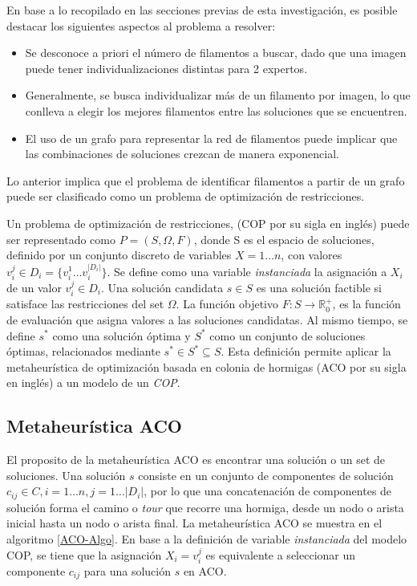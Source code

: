 En base a lo recopilado en las secciones previas de esta investigaci\'on, es posible destacar los siguientes aspectos al problema a resolver:

\begin{itemize}
    \item Se desconoce a priori el n\'umero de filamentos a buscar, dado que una imagen puede tener individualizaciones distintas para 2 expertos.
    \item Generalmente, se busca individualizar m\'as de un filamento por imagen, lo que conlleva a elegir los mejores filamentos entre las soluciones que se encuentren.
    \item El uso de un grafo para representar la red de filamentos puede implicar que las combinaciones de soluciones crezcan de manera exponencial.
\end{itemize}

Lo anterior implica que el problema de identificar filamentos a partir de un grafo puede ser clasificado como un problema de optimizaci\'on de restricciones\cite{blum2011hybrid}.

Un problema de optimización de restricciones, (COP por su sigla en ingl\'es) puede ser representado como $P = (S, \Omega, F)$, donde S es el espacio de soluciones, definido por un conjunto discreto de variables $X = 1 \dotsc n$, con valores $v_{i}^{j} \in D_{i} = \{v_{i}^{1} \dotsc  v_{i}^{|D_{i}|}\}$. Se define como una variable {\it instanciada} la asignaci\'on a $X_i$ de un valor $v_{i}^{j} \in D_i$. Una solución candidata $s \in S$ es una soluci\'on factible si satisface las restricciones del set $\Omega$. La funci\'on objetivo $F: S\rightarrow \mathbb R_{0}^{+}$, es la funci\'on de evaluaci\'on que asigna valores a las soluciones candidatas. Al mismo tiempo, se define $s^{*}$ como una soluci\'on \'optima y $S^{*}$ como un conjunto de soluciones \'optimas, relacionados mediante $s^{*} \in S^{*} \subseteq S $\cite{socha2008ant}.
Esta definici\'on permite aplicar la metaheur\'istica de optimizaci\'on basada en colonia de hormigas (ACO por su sigla en ingl\'es) a un modelo de un {\it COP}.

\subsection{Metaheur\'istica ACO}
El proposito de la metaheur\'istica ACO es encontrar una soluci\'on o un set de soluciones. Una soluci\'on $s$ consiste en un conjunto de componentes de soluci\'on $c_{ij} \in C, i = 1 \dotsc n, j = 1 \dotsc |D_i|$, por lo que una concatenaci\'on de componentes de soluci\'on forma el camino o {\it tour} que recorre una hormiga, desde un nodo o arista inicial hasta un nodo o arista final. La metaheur\'istica ACO se muestra en el algoritmo \ref{ACO-Algo}. En base a la definici\'on de variable {\it instanciada} del modelo COP, se tiene que la asignaci\'on $X_i = v_{i}^{j}$ es equivalente a seleccionar un componente $c_{ij}$ para una soluci\'on $s$ en ACO.

